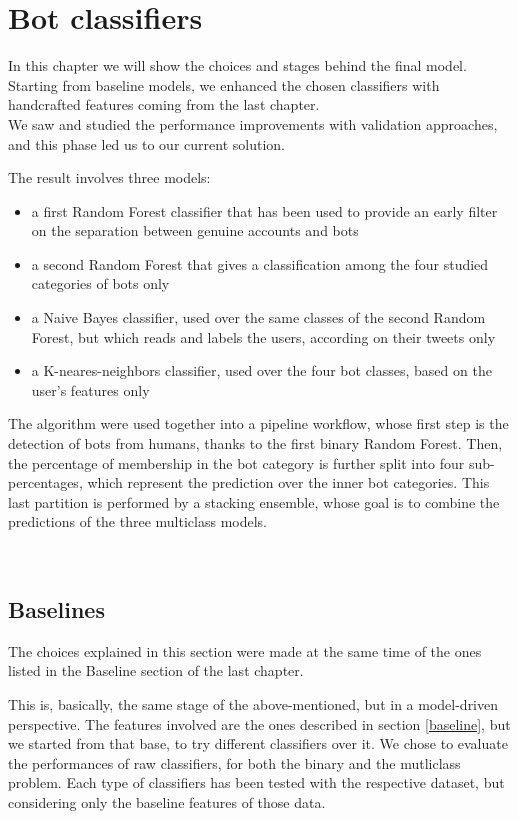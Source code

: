 \chapter{Bot classifiers}
\label{capitolo5}
\thispagestyle{empty}

In this chapter we will show the choices and stages behind the final model.
Starting from baseline models, we enhanced the chosen classifiers with handcrafted features coming from the last chapter.\\
We saw and studied the performance improvements with validation approaches, and this phase led us to our current solution.

The result involves three models:
\begin{itemize}
	\item[\PencilRight] a first Random Forest classifier that has been used to provide an early filter on the separation between genuine accounts and bots
	\item[\PencilRight] a second Random Forest that gives a classification among the four studied categories of bots only
	\item[\PencilRight] a Naive Bayes classifier, used over the same classes of the second Random Forest, but which reads and labels the users, according on their tweets only
	\item[\PencilRight] a K-neares-neighbors classifier, used over the four bot classes, based on the user's features only
\end{itemize}
The algorithm were used together into a pipeline workflow, whose first step is the detection of bots from humans, thanks to the first binary Random Forest.
Then, the percentage of membership in the bot category is further split into four sub-percentages, which represent the prediction over the inner bot categories.
This last partition is performed by a stacking ensemble, whose goal is to combine the predictions of the three multiclass models.

\
\section{Baselines}
The choices explained in this section were made at the same time of the ones listed in the Baseline section of the last chapter.

This is, basically, the same stage of the above-mentioned, but in a model-driven perspective.
The features involved are the ones described in section \ref{baseline}, but we started from that base, to try different classifiers over it.
We chose to evaluate the performances of raw classifiers, for both the binary and the mutliclass problem.
Each type of classifiers has been tested with the respective dataset, but considering only the baseline features of those data.

